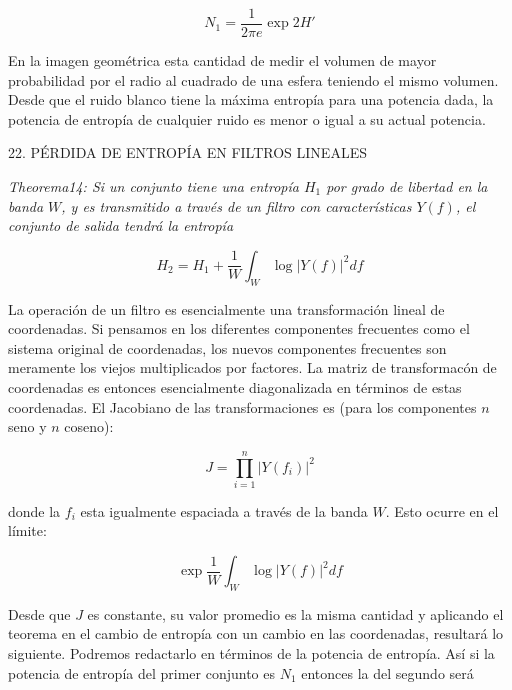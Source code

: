 \begin{equation}
N_{1}=\frac{1}{2\pi e}\exp 2{H}'
\end{equation}

En la imagen geom\'etrica esta cantidad de medir el volumen de mayor probabilidad por el radio al cuadrado de una esfera teniendo el mismo volumen. Desde que el ruido blanco tiene la m\'axima entrop\'ia para una potencia dada, la potencia de entrop\'ia de cualquier ruido es menor o igual a su actual potencia.\newline \newline

22. P\'ERDIDA DE ENTROP\'IA EN FILTROS LINEALES

\textit{Theorema14: Si un conjunto tiene una entrop\'ia $H_{1}$ por grado de libertad en la banda $W$, y es transmitido a trav\'es de un filtro con caracter\'isticas $Y\left ( f \right )$, el conjunto de salida tendr\'a la entrop\'ia} 

\begin{equation}
H_{2}=H_{1}+\frac{1}{W}\int_{W}^{\:}\log \left | Y\left ( f \right ) \right |^{2}df
\end{equation}

La operaci\'on de un filtro es esencialmente una transformaci\'on lineal de coordenadas. Si pensamos en los diferentes componentes frecuentes como el sistema original de coordenadas, los nuevos componentes frecuentes son meramente los viejos multiplicados por factores. La matriz de transformac\'on de coordenadas es entonces esencialmente diagonalizada en t\'erminos de estas coordenadas. El Jacobiano de las transformaciones es (para los componentes $n$ seno y $n$ coseno):

\begin{equation}
J=\prod_{i=1}^{n}\left | Y\left ( f_{i} \right )  \right |^{2}
\end{equation}

donde la $f_{i}$ esta igualmente espaciada a trav\'es de la banda $W$. Esto ocurre en el l\'imite:

\begin{equation}
\exp \frac{1}{W}\int_{W}^{\:}\log \left | Y\left ( f \right ) \right |^{2}df
\end{equation}

Desde que $J$ es constante, su valor promedio es la misma cantidad y aplicando el teorema en el cambio de entrop\'ia con un cambio en las coordenadas, resultar\'a lo siguiente. Podremos redactarlo en t\'erminos de la potencia de entrop\'ia. As\'i si la potencia de entrop\'ia del primer conjunto es $N_{1}$ entonces la del segundo ser\'a

